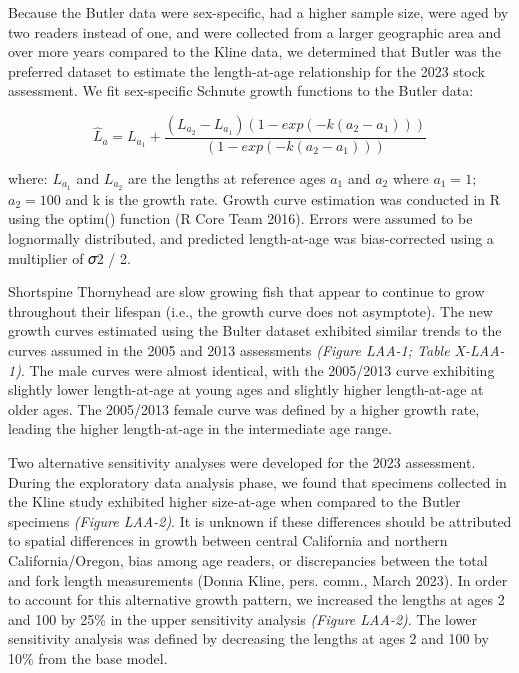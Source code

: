 \documentclass[11pt,
  english,
  letterpaper,
]{article}
\begin{document}
Because the Butler data were sex-specific, had a higher sample size, were aged by two readers instead of one, and were collected from a larger geographic area and over more years compared to the Kline data, we determined that Butler was the preferred dataset to estimate the length-at-age relationship for the 2023 stock assessment. We fit sex-specific Schnute growth functions to the Butler data:

\begin{equation} \hat{L}_{a} = L_{a_{1}}+\frac{(L_{a_{2}}-L_{a_{1}})(1-exp(-k(a_{2}-a_{1})))}{(1-exp(-k(a_{2}-a_{1})))}\end{equation}

where: \(L_{a_{1}}\) and \(L_{a_{2}}\) are the lengths at reference ages \(a_{1}\) and \(a_{2}\) where \(a_{1}=1\);\(a_{2}=100\) and k is the growth rate. Growth curve estimation was conducted in R using the optim() function (R Core Team 2016). Errors were assumed to be lognormally distributed, and predicted length-at-age was bias-corrected using a multiplier of 𝜎2 / 2.

Shortspine Thornyhead are slow growing fish that appear to continue to grow throughout their lifespan (i.e., the growth curve does not asymptote). The new growth curves estimated using the Bulter dataset exhibited similar trends to the curves assumed in the 2005 and 2013 assessments \emph{\emph{(Figure LAA-1; Table X-LAA-1)}}. The male curves were almost identical, with the 2005/2013 curve exhibiting slightly lower length-at-age at young ages and slightly higher length-at-age at older ages. The 2005/2013 female curve was defined by a higher growth rate, leading the higher length-at-age in the intermediate age range.

Two alternative sensitivity analyses were developed for the 2023 assessment. During the exploratory data analysis phase, we found that specimens collected in the Kline study exhibited higher size-at-age when compared to the Butler specimens \emph{\emph{(Figure LAA-2)}}. It is unknown if these differences should be attributed to spatial differences in growth between central California and northern California/Oregon, bias among age readers, or discrepancies between the total and fork length measurements (Donna Kline, pers. comm., March 2023). In order to account for this alternative growth pattern, we increased the lengths at ages 2 and 100 by 25\% in the upper sensitivity analysis \emph{\emph{(Figure LAA-2)}}. The lower sensitivity analysis was defined by decreasing the lengths at ages 2 and 100 by 10\% from the base model.
\end{document}

